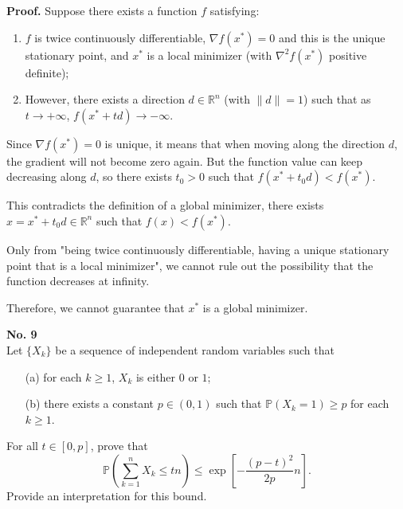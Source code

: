\documentclass[a4paper, 11pt]{article}
\newenvironment{problem}[2][No.]
    { \begin{mdframed}[backgroundcolor=gray!5] \textbf{#1 #2} \\}
    {  \end{mdframed}}
\newenvironment{solution}
    {\textbf{Proof.}}
    {}
\begin{document}
\begin{solution}
Suppose there exists a function \( f \) satisfying:  
\begin{enumerate}
	\item \( f \) is twice continuously differentiable, \( \nabla f(x^*) = 0 \) and this is the unique stationary point, and \( x^* \) is a local minimizer (with \( \nabla^2 f(x^*) \) positive definite);  
	\item However, there exists a direction \( d \in \mathbb{R}^n \) (with \( \|d\| = 1 \)) such that as \( t \to +\infty \), \( f(x^* + td) \to -\infty \).  
\end{enumerate}

Since \( \nabla f(x^*) = 0 \) is unique, it means that when moving along the direction \( d \), the gradient will not become zero again. But the function value can keep decreasing along \( d \), so there exists \( t_0 > 0 \) such that \( f(x^* + t_0d) < f(x^*) \).  

This contradicts the definition of a global minimizer, there exists \( x = x^* + t_0d \in \mathbb{R}^n \) such that \( f(x) < f(x^*) \).  

Only from "being twice continuously differentiable, having a unique stationary point that is a local minimizer", we cannot rule out the possibility that the function decreases at infinity.

Therefore, we cannot guarantee that \( x^* \) is a global minimizer.  

\end{solution}

\begin{problem}{9}
	Let \( \{X_k\} \) be a sequence of independent random variables such that
	\begin{enumerate}
		\item[(a)] for each \( k \geq 1 \), \( X_k \) is either \( 0 \) or \( 1 \);
		\item[(b)] there exists a constant \( p \in (0, 1) \) such that \( \mathbb{P}(X_k = 1) \geq p \) for each \( k \geq 1 \).
	\end{enumerate}
	For all \( t \in [0, p] \), prove that
$$
	\mathbb{P}\left( \sum_{k = 1}^n X_k \leq tn \right) \leq \exp\left[ -\frac{(p - t)^2}{2p} n \right].
$$
	Provide an interpretation for this bound.
\end{problem}
\end{document}
